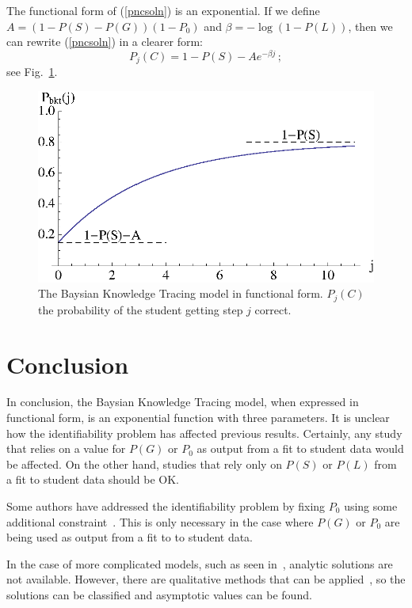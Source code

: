 \documentclass[11pt,letterpaper]{article}
\begin{document}
The functional form of (\ref{pncsoln}) is an exponential.
If we define 
$A=\left(1-P(S)-P(G)\right) \left(1-P_0\right)$ and
$\beta=-\log(1-P(L))$, then we can rewrite (\ref{pncsoln}) in 
a clearer form:
%
\begin{equation}
         P_j(C) = 1-P(S) -A e^{-\beta j} \, ;
\end{equation}
%
see Fig.~\ref{bktgraph}.

\begin{figure}
\centering\includegraphics{exponential.eps}
\caption{The Baysian Knowledge Tracing model in functional form. 
          $P_j(C)$ the probability of  the student getting step $j$ correct.}
 \label{bktgraph}
\end{figure}

\section{Conclusion}

In conclusion, the Baysian Knowledge Tracing model, when expressed
in functional form, is an exponential function with three parameters.
It is unclear how the identifiability problem has affected previous
results.  Certainly, any study that relies on a value for $P(G)$ or
$P_0$ as output from a fit to student data would be affected.
On the other hand, studies that rely only on $P(S)$ or $P(L)$ from
a fit to student data should be OK.

Some authors have addressed the identifiability problem by 
fixing $P_0$ using some additional constraint~\cite{fix}.  
This is only necessary in the case
where $P(G)$ or $P_0$ are being used as output from a fit 
to to student data.

In the case of more complicated models, such as seen 
in~\cite{bca,brunskill}, analytic solutions are not available.  However,
there are qualitative methods that can be applied~\cite{qualitative},
so the solutions can be classified and asymptotic values can 
be found.
\end{document}

